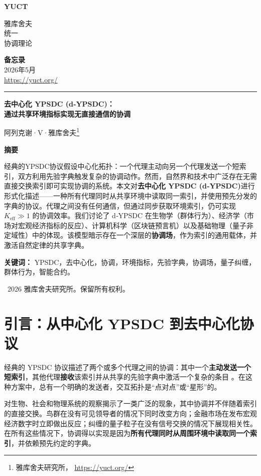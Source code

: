 \documentclass[11pt,a4paper]{article}
\newcommand{\makeheader}{%
	\noindent
	\begin{minipage}{0.17\textwidth}
		\raggedright
		{\sffamily\bfseries\color{skyblue}\fontsize{46}{46}\selectfont YUCT}%
	\end{minipage}%
	\hspace{30pt}
	\begin{minipage}{0.32\textwidth}
		\raggedright
		{\sffamily\fontsize{11}{13}\selectfont 雅库舍夫\\ 统一\\ 协调理论}%
	\end{minipage}%
	\hfill
	\begin{minipage}{0.38\textwidth}
		\raggedleft
		{\sffamily\bfseries 备忘录}\\
		{\sffamily 2026年5月}\\
		{\sffamily\footnotesize \url{https://yuct.org/}}%
	\end{minipage}
	\par\vspace{5pt}
	\noindent\textcolor{gold}{\rule{\textwidth}{1.6pt}}
	\par\vspace{0pt}
}
\begin{document}
	\renewcommand{\thepage}{\arabic{page}}
	\thispagestyle{firstpage}
	\makeheader
	
	\vspace{0cm}
	{\LARGE\bfseries 去中心化 YPSDC (d‑YPSDC)：\\ 通过共享环境指标实现无直接通信的协调 \par}
	\vspace{0.2cm}
	
	{\large 阿列克谢·V·雅库舍夫\footnote{雅库舍夫研究所， \url{https://yuct.org/}}} \\
	\vspace{0.0cm}
	
	{\color{darkblue}\textbf{\LARGE 摘要}} \par
	{\large
		\noindent
		经典的YPSDC协议假设中心化拓扑：一个代理主动向另一个代理发送一个短索引，双方利用先验字典触发复杂的协调动作。然而，自然界和技术中广泛存在无需直接交换索引即可实现协调的系统。本文对\textbf{去中心化 YPSDC (d‑YPSDC)}进行形式化描述——一种所有代理同时从共享环境中读取同一索引，并使用预先分发的字典的协议。代理之间没有任何通信，但通过同步获取环境索引，仍可实现 \(K_{\mathrm{eff}} \gg 1\) 的协调效率。我们讨论了 d‑YPSDC 在生物学（群体行为）、经济学（市场对宏观经济指标的反应）、计算机科学（区块链预言机）以及基础物理（量子非定域性）中的体现。该模型暗示存在一个深层的\textbf{协调场}，作为索引的通用载体，并激活自然定律的共享字典。
	}
	
	\vspace{0.1cm}
	\noindent
	{\color{darkblue}\textbf{关键词：}} YPSDC，去中心化，协调，环境指标，先验字典，协调场，量子纠缠，群体行为，智能合约。
	
	\vspace{0.5cm}
	\noindent
	\textcopyright\ 2026 雅库舍夫研究所。保留所有权利。
	
	\tableofcontents
	\newpage
	
	\section{引言：从中心化 YPSDC 到去中心化协议}
	
	经典的 YPSDC 协议描述了两个或多个代理之间的协调：其中一个\textbf{主动发送一个短索引}，其他代理\textbf{接收}该索引并从共享的先验字典中激活一个复杂的条目 \cite{YUCT}。在这种方案中，总有一个明确的发送者，交互拓扑是“点对点”或“星形”的。
	
	对生物、社会和物理系统的观察揭示了一类广泛的现象，其中协调并不伴随着索引的直接交换。鸟群在没有可见领导者的情况下同时改变方向；金融市场在发布宏观经济数字时立即做出反应；纠缠的量子粒子在没有信号交换的情况下展现相关性。在所有这些情况下，协调得以实现是因为\textbf{所有代理同时从周围环境中读取同一个索引}，并依赖预先约定的字典。
	
\end{document}
